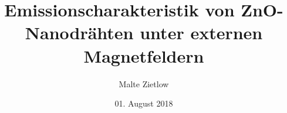 \documentclass[12pt,twoside,bind,ams,a4paper]{hepthesis}
\author{Malte Zietlow}
\title{Emissionscharakteristik von ZnO-Nanodrähten unter externen Magnetfeldern}
\date{01. August 2018}
\begin{document}
\renewcommand*\chapterheadstartvskip{\vspace*{-2cm}}
\renewcommand*{\figurename}{Abb.}
\renewcommand*{\figureautorefname}{Abb.}
\renewcommand*{\tablename}{Tab.}
\renewcommand*{\tableautorefname}{Tab.}
\renewcommand*{\chapterautorefname}{Kapitel}
\renewcommand*{\sectionautorefname}{Kapitel}
\renewcommand*{\subsectionautorefname}{Kapitel}
\renewcommand*{\equationautorefname}{Gl.}

\begin{frontmatter}

\end{frontmatter}
\setlength{\evensidemargin}{0.6cm}			%
\setlength{\oddsidemargin}{0.6cm}			%
\begin{mainmatter}

\end{mainmatter}

\begin{appendices}

\end{appendices}

\begin{backmatter}

\end{backmatter}
\end{document}
